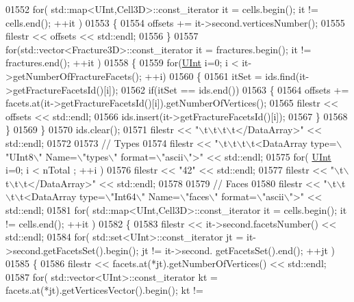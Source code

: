 \begin{DoxyCode}
01552     \textcolor{keywordflow}{for}( std::map<UInt,Cell3D>::const\_iterator it = cells.begin(); it != cells.end(); ++it )
01553     \{
01554         offsets += it->second.verticesNumber();
01555         filestr << offsets << std::endl;
01556     \}
01557     \textcolor{keywordflow}{for}(std::vector<Fracture3D>::const\_iterator it = fractures.begin(); it != fractures.end(); ++it )
01558     \{
01559         \textcolor{keywordflow}{for}(\hyperlink{namespaceFVCode3D_a4bf7e328c75d0fd504050d040ebe9eda}{UInt} i=0; i < it->getNumberOfFractureFacets(); ++i)
01560         \{
01561             itSet = ids.find(it->getFractureFacetsId()[i]);
01562             \textcolor{keywordflow}{if}(itSet == ids.end())
01563             \{
01564                 offsets += facets.at(it->getFractureFacetsId()[i]).getNumberOfVertices();
01565                 filestr << offsets << std::endl;
01566                 ids.insert(it->getFractureFacetsId()[i]);
01567             \}
01568         \}
01569     \}
01570     ids.clear();
01571     filestr << \textcolor{stringliteral}{"\(\backslash\)t\(\backslash\)t\(\backslash\)t\(\backslash\)t</DataArray>"} << std::endl;
01572 
01573     \textcolor{comment}{//  Types}
01574     filestr << \textcolor{stringliteral}{"\(\backslash\)t\(\backslash\)t\(\backslash\)t\(\backslash\)t<DataArray type=\(\backslash\)"UInt8\(\backslash\)" Name=\(\backslash\)"types\(\backslash\)" format=\(\backslash\)"ascii\(\backslash\)">"} << std::endl;
01575     \textcolor{keywordflow}{for}( \hyperlink{namespaceFVCode3D_a4bf7e328c75d0fd504050d040ebe9eda}{UInt} i=0; i < nTotal ; ++i )
01576         filestr << \textcolor{stringliteral}{"42"} << std::endl;
01577     filestr << \textcolor{stringliteral}{"\(\backslash\)t\(\backslash\)t\(\backslash\)t\(\backslash\)t</DataArray>"} << std::endl;
01578 
01579     \textcolor{comment}{//  Faces}
01580     filestr << \textcolor{stringliteral}{"\(\backslash\)t\(\backslash\)t\(\backslash\)t\(\backslash\)t<DataArray type=\(\backslash\)"Int64\(\backslash\)" Name=\(\backslash\)"faces\(\backslash\)" format=\(\backslash\)"ascii\(\backslash\)">"} << std::endl;
01581     \textcolor{keywordflow}{for}( std::map<UInt,Cell3D>::const\_iterator it = cells.begin(); it != cells.end(); ++it )
01582     \{
01583         filestr << it->second.facetsNumber() << std::endl;
01584         \textcolor{keywordflow}{for}( std::set<UInt>::const\_iterator jt = it->second.getFacetsSet().begin(); jt != it->second.
      getFacetsSet().end(); ++jt )
01585         \{
01586             filestr << facets.at(*jt).getNumberOfVertices() << std::endl;
01587             \textcolor{keywordflow}{for}( std::vector<UInt>::const\_iterator kt = facets.at(*jt).getVerticesVector().begin(); kt != 

\end{DoxyCode}
